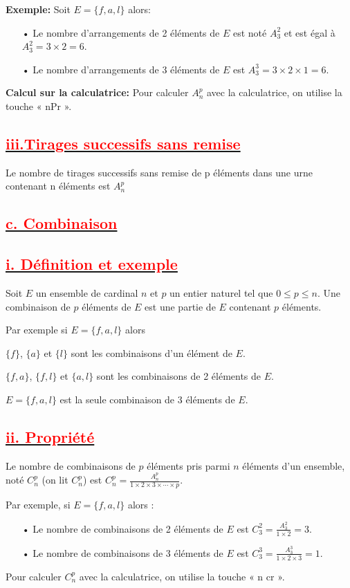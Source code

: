 \documentclass[12pt]{article}
\begin{document}
\textbf{Exemple:}
Soit \( E = \{f, a, l\} \) alors:
\begin{itemize}
    \item[•] Le nombre d'arrangements de 2 éléments de \( E \) est noté \( A_3^2 \) et est égal à \( A_3^2 = 3 \times 2 = 6 \).
    \item[•] Le nombre d'arrangements de 3 éléments de \( E \) est \( A_3^3 = 3 \times 2 \times 1 = 6 \).
\end{itemize}

\textbf{Calcul sur la calculatrice:}
Pour calculer \( A_n^p \) avec la calculatrice, on utilise la touche « nPr ».
\subsection*{\underline{\textbf{\textcolor{red}{iii.Tirages successifs sans remise}}}}
Le nombre de tirages successifs sans remise de p éléments dans une urne contenant n 
éléments est $A_{n}^{p}$
\subsection*{\underline{\textbf{\textcolor{red}{c. Combinaison}}}}
\subsection*{\underline{\textbf{\textcolor{red}{i. Définition et exemple }}}}
Soit $E$ un ensemble de cardinal $n$ et $p$ un entier naturel tel que $0 \leq p \leq n$. Une combinaison de 
$p$ éléments de $E$ est une partie de $E$ contenant $p$ éléments.

Par exemple si $E = \{f, a, l\}$ alors

$\{f\}$, $\{a\}$ et $\{l\}$ sont les combinaisons d'un élément de $E$.

$\{f, a\}$, $\{f, l\}$ et $\{a, l\}$ sont les combinaisons de 2 éléments de $E$.

$E = \{f, a, l\}$ est la seule combinaison de 3 éléments de $E$.
\subsection*{\underline{\textbf{\textcolor{red}{ii. Propriété }}}}
Le nombre de combinaisons de $p$ éléments pris parmi $n$ éléments d'un ensemble, noté $C_{n}^{p}$ (on lit $C_{n}^{p}$) est $C_{n}^{p} = \frac{A_{n}^{p}}{1 \times 2 \times 3 \times \cdots \times p}$.

Par exemple, si $E = \{f, a, l\}$ alors :
\begin{itemize}
  \item[•] Le nombre de combinaisons de 2 éléments de $E$ est $C_{3}^{2} = \frac{A_{3}^{2}}{1 \times 2} = 3$.
  \item[•] Le nombre de combinaisons de 3 éléments de $E$ est $C_{3}^{3} = \frac{A_{3}^{3}}{1 \times 2 \times 3} = 1$.
\end{itemize}
Pour calculer $C_{n}^{p}$ avec la calculatrice, on utilise la touche « n cr ».
\end{document}
